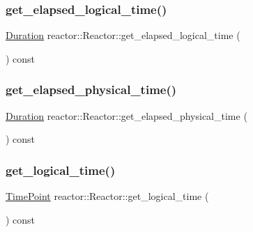 \subsubsection{\texorpdfstring{get\+\_\+elapsed\+\_\+logical\+\_\+time()}{get\_elapsed\_logical\_time()}}
{\footnotesize\ttfamily \hyperlink{namespacereactor_aa8375b807a80703545664096c5b5b779}{Duration} reactor\+::\+Reactor\+::get\+\_\+elapsed\+\_\+logical\+\_\+time (\begin{DoxyParamCaption}{ }\end{DoxyParamCaption}) const}

\mbox{\label{classreactor_1_1Reactor_a206bd63d5ad7c2c39a89d9220f0acbbc}} 
\subsubsection{\texorpdfstring{get\+\_\+elapsed\+\_\+physical\+\_\+time()}{get\_elapsed\_physical\_time()}}
{\footnotesize\ttfamily \hyperlink{namespacereactor_aa8375b807a80703545664096c5b5b779}{Duration} reactor\+::\+Reactor\+::get\+\_\+elapsed\+\_\+physical\+\_\+time (\begin{DoxyParamCaption}{ }\end{DoxyParamCaption}) const}

\mbox{\label{classreactor_1_1Reactor_ae3b8bb1187b16901c8a140090579e6c9}} 
\subsubsection{\texorpdfstring{get\+\_\+logical\+\_\+time()}{get\_logical\_time()}}
{\footnotesize\ttfamily \hyperlink{namespacereactor_ad950f8d1a46612500286a4af0f167080}{Time\+Point} reactor\+::\+Reactor\+::get\+\_\+logical\+\_\+time (\begin{DoxyParamCaption}{ }\end{DoxyParamCaption}) const}

\mbox{\label{classreactor_1_1Reactor_abfdf519fd67c4fc13debc60dbc68bec3}} 
